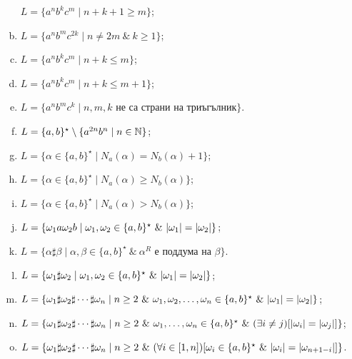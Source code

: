 \begin{problem}
\begin{enumerate}[a)]
    $L = \{a^nb^kc^m \mid n + k + 1 \geq m\}$;
  \item
    $L = \{a^nb^mc^{2k} \mid n \neq 2m\ \&\ k \geq 1\}$;
  \item
    $L = \{a^nb^kc^m \mid n + k \leq m\}$;
  \item
    $L = \{a^nb^kc^m \mid n + k \leq m+1\}$;
  \item
    $L = \{a^nb^mc^k \mid n, m, k \text{ не са страни на триъгълник}\}$.
  \item
    $L = \{a,b\}^\star \setminus \{a^{2n}b^n \mid n\in\mathbb{N}\}$;
  \item
    $L = \{\alpha \in \{a,b\}^\star\mid N_a(\alpha) = N_b(\alpha) + 1\}$;
  \item
    $L = \{\alpha \in \{a,b\}^\star\mid N_a(\alpha) \geq N_b(\alpha)\}$;
  \item
    $L = \{\alpha \in \{a,b\}^\star\mid N_a(\alpha) > N_b(\alpha)\}$;
  \item
    $L = \{\omega_1 a \omega_2 b \mid \omega_1,\omega_2 \in \{a,b\}^\star\ \&\ \lvert{\omega_1}\rvert = \lvert{\omega_2}\rvert\}$;
  \item
    $L = \{\alpha \sharp \beta \mid \alpha,\beta \in \{a,b\}^\star\ \&\ \alpha^R\mbox{ е поддума на }\beta \}$.
  \item 
    $L = \{\omega_1\sharp\omega_2 \mid \omega_1,\omega_2 \in \{a,b\}^\star\ \&\ \lvert{\omega_1}\rvert = \lvert{\omega_2}\rvert\}$;
  \item
    $L = \{\omega_1 \sharp \omega_2 \sharp \cdots \sharp \omega_n \mid n\geq 2\ \&\ \omega_1,\omega_2,\dots,\omega_n \in \{a,b\}^\star\ \&\ \abs{\omega_1} = \abs{\omega_2}\}$;
  \item
    $L = \{\omega_1 \sharp \omega_2 \sharp \cdots \sharp \omega_n \mid n\geq 2\ \&\ \omega_1,\dots,\omega_n \in \{a,b\}^\star\ \&\ (\exists i \neq j)[\lvert{\omega_i}\rvert = \lvert{\omega_j}\rvert]\}$;
  \item
    $L = \{\omega_1 \sharp \omega_2 \sharp \cdots \sharp \omega_n \mid n\geq 2\ \&\ (\forall i\in[1,n])[\omega_i \in \{a,b\}^\star\ \&\ \lvert{\omega_i}\rvert = \lvert{\omega_{n+1-i}}\rvert]\}$.
  \end{enumerate}
\end{problem}


